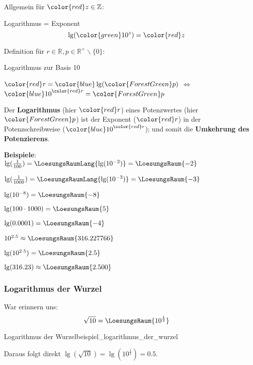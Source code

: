 \vspace{5mm}

Allgemein für ${\color{red}z}\in \mathbb{Z}$:

\begin{definition}{Logarithmus = Exponent}{}
  $$\lg({\color{green} 10^z}) = {\color{red} z}$$
\end{definition}


Definition für $r\in\mathbb{R}, p \in \mathbb{R}^{+}\backslash\{0\}$:
\begin{definition}{Logarithmus zur Basis 10}{}
  \begin{center}
    ${\color{red}r} = {\color{blue}\lg}({\color{ForestGreen}p})$
    $\Longleftrightarrow$
    ${\color{blue}10}^{\color{red}r}={\color{ForestGreen}p}$
    \end{center}
\end{definition}

\begin{bemerkung}{}{}
  Der \textbf{Logarithmus} (hier $\color{red}r$) eines Potenzwertes
  (hier $\color{ForestGreen}p$) ist der Exponent ($\color{red}r$) in der
  Potenzschreibweise (${\color{blue}10}^{\color{red}r}$); und somit die \textbf{Umkehrung des Potenzierens}.
\end{bemerkung}

\textbf{Beispiele}:\\

$\lg(\frac1{100}) =\LoesungsRaumLang{\lg(10^{-2}) } = \LoesungsRaum{-2}$
\leserluft{}

$\lg(\frac1{1000}) =\LoesungsRaumLang{\lg(10^{-3}) } = \LoesungsRaum{-3}$
\leserluft{}

$\lg(10^{-8}) = \LoesungsRaum{-8}$
\leserluft{}

$\lg(100 \cdot{} 1000) = \LoesungsRaum{5}$
\leserluft{}

$\lg(0.0001) = \LoesungsRaum{-4}$
\leserluft{}

$10^{2.5} \approx \LoesungsRaum{316.227766}$
\leserluft{}

$\lg(10^{2.5}) = \LoesungsRaum{2.5}$

\leserluft{}

$\lg(316.23) \approx \LoesungsRaum{2.500}$


\newpage
\subsubsection{Logarithmus der Wurzel}
War erinnern uns: $$\sqrt{10} =\LoesungsRaum{ 10^\frac12}$$
\begin{beispiel}{Logarithmus der
    Wurzel}{beispiel_logarithmus_der_wurzel}

  Daraus folgt direkt $\lg(\sqrt{10}) =\lg(10^\frac12)  = 0.5$.
\end{beispiel}

